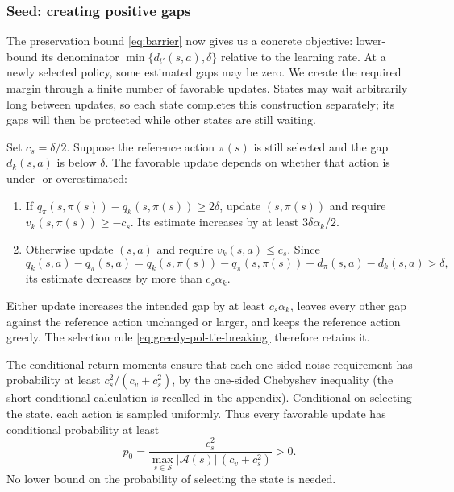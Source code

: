 \documentclass[twoside,11pt]{article}
\DeclareRobustCommand{\reviewbarstart}{%
  \ifhmode %
    \vadjust{\vbox to 0pt{%
      \vskip-\ht\strutbox %
      \vskip-\dp\strutbox %
      \cbstart[\changebarwidth] %
      \vss %
    }}%
  \else %
    \cbstart[\changebarwidth]%
  \fi %
} %
\providecommand{\DIFadd}[1]{#1} %
\providecommand{\DIFaddbegin}{\reviewbarstart} %
\providecommand{\DIFaddend}{\protect\cbend} %
\def\DIFadd#1{#1}%
\def\DIFaddbegin{}%
\def\DIFaddend{}%
\begin{document}
\DIFaddbegin \subsubsection{\DIFadd{Seed: creating positive gaps}}
\DIFadd{The preservation bound \eqref{eq:barrier} now gives us a concrete objective: lower-bound its denominator $\min\{d_{t'}(s,a),\delta\}$ relative to the learning rate. At a newly selected policy, some estimated gaps may be zero. We create the required margin through a finite number of favorable updates. States may wait arbitrarily long between updates, so each state completes this construction separately; its gaps will then be protected while other states are still waiting.
}\DIFaddend 

 \DIFaddbegin \DIFadd{Set $c_s=\delta/2$. Suppose the reference action $\pi(s)$ is still selected and the gap $d_k(s,a)$ is below $\delta$. The favorable update depends on whether that action is under- or overestimated:
}\begin{enumerate}
\item \DIFaddend If  \DIFaddbegin \DIFadd{$q_\pi(s,\pi(s))-q_k(s,\pi(s))\ge2\delta$, update $(s,\pi(s))$ and require $v_k(s,\pi(s))\ge-c_s$. Its estimate increases by at least $3\delta\alpha_k/2$.
}\item \DIFadd{Otherwise update }\DIFaddend $(s,a)$  \DIFaddbegin \DIFadd{and require $v_k(s,a)\le c_s$. Since
}\[
\DIFadd{q_k(s,a)-q_\pi(s,a)
=q_k(s,\pi(s))-q_\pi(s,\pi(s))+d_\pi(s,a)-d_k(s,a)>\delta,
}\]\DIFaddend 
 \DIFaddbegin \DIFadd{its estimate decreases by more than $c_s\alpha_k$.
}\end{enumerate}
\DIFadd{Either update increases the intended gap by at least $c_s\alpha_k$, leaves every other gap against the reference action unchanged or larger, and keeps the reference action greedy. The selection rule \eqref{eq:greedy-pol-tie-breaking} therefore retains it.
}\DIFaddend 

 \DIFaddbegin \DIFadd{The conditional return moments ensure that each one-sided noise requirement has probability at least $c_s^2/(c_v+c_s^2)$, by the one-sided Chebyshev inequality (the short conditional calculation is recalled in the appendix). Conditional on selecting the state, each action is sampled uniformly. Thus every favorable update has conditional probability at least
}\begin{equation}
\DIFadd{\label{eq:localprob}
p_0=\frac{c_s^2}{\max_{s\in\mathcal S}|\mathcal A(s)|\,(c_v+c_s^2)}>0.
}\end{equation}\DIFaddend 
\DIFaddbegin \DIFadd{No lower bound on the probability of selecting the state is needed.
}\DIFaddend 
\end{document}
